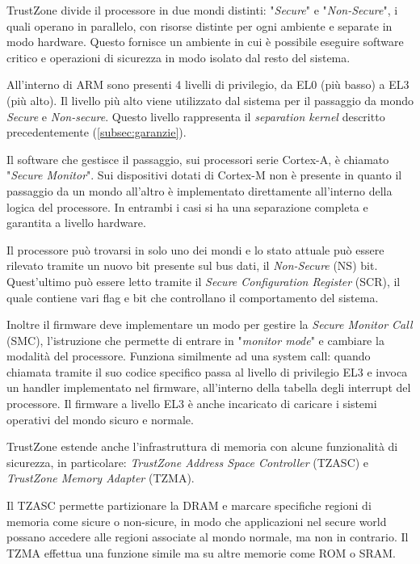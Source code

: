 \documentclass[12pt,italian]{report}
\begin{document}
	TrustZone divide il processore in due mondi distinti: "\textit{Secure}" e "\textit{Non-Secure}", i quali operano in parallelo, con risorse distinte per ogni ambiente e separate in modo hardware. Questo fornisce un ambiente in cui è possibile eseguire software critico e operazioni di sicurezza in modo isolato dal resto del sistema.
	
	All'interno di ARM sono presenti 4 livelli di privilegio, da EL0 (più basso) a EL3 (più alto). Il livello più alto viene utilizzato dal sistema per il passaggio da mondo \textit{Secure} e \textit{Non-secure}. Questo livello rappresenta il \textit{separation kernel} descritto precedentemente (\ref{subsec:garanzie}).
	
	Il software che gestisce il passaggio, sui processori serie Cortex-A, è chiamato "\textit{Secure Monitor}". Sui dispositivi dotati di Cortex-M non è presente in quanto il passaggio da un mondo all'altro è implementato direttamente all'interno della logica del processore. In entrambi i casi si ha una separazione completa e garantita a livello hardware.
	
	\bigbreak
	
	Il processore può trovarsi in solo uno dei mondi e lo stato attuale può essere rilevato tramite un nuovo bit presente sul bus dati, il \textit{Non-Secure} (NS) bit. Quest'ultimo può essere letto tramite il \textit{Secure Configuration Register} (SCR), il quale contiene vari flag e bit che controllano il comportamento del sistema. 
	
	Inoltre il firmware deve implementare un modo per gestire la \textit{Secure Monitor Call} (SMC), l'istruzione che permette di entrare in "\textit{monitor mode}" e cambiare la modalità del processore. Funziona similmente ad una system call: quando chiamata tramite il suo codice specifico passa al livello di privilegio EL3 e invoca un handler implementato nel firmware, all'interno della tabella degli interrupt del processore.
	Il firmware a livello EL3 è anche incaricato di caricare i sistemi operativi del mondo sicuro e normale.
	
	
	\bigbreak
	
	TrustZone estende anche l'infrastruttura di memoria con alcune funzionalità di sicurezza, in particolare: \textit{TrustZone Address Space Controller} (TZASC) e \textit{TrustZone Memory Adapter} (TZMA).
	
	Il TZASC permette partizionare la DRAM e marcare specifiche regioni di memoria come sicure o non-sicure, in modo che applicazioni nel secure world possano accedere alle regioni associate al mondo normale, ma non in contrario. Il TZMA effettua una funzione simile ma su altre memorie come ROM o SRAM.
	
\end{document}
